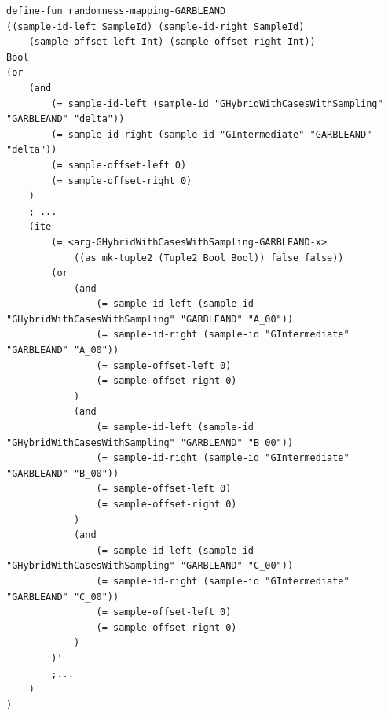 \begin{longlisting}
\begin{verbatim}
define-fun randomness-mapping-GARBLEAND
((sample-id-left SampleId) (sample-id-right SampleId)
    (sample-offset-left Int) (sample-offset-right Int))
Bool 
(or
    (and
        (= sample-id-left (sample-id "GHybridWithCasesWithSampling" "GARBLEAND" "delta"))
        (= sample-id-right (sample-id "GIntermediate" "GARBLEAND" "delta"))
        (= sample-offset-left 0)
        (= sample-offset-right 0)
    )
    ; ...
    (ite
        (= <arg-GHybridWithCasesWithSampling-GARBLEAND-x> 
            ((as mk-tuple2 (Tuple2 Bool Bool)) false false))
        (or
            (and
                (= sample-id-left (sample-id "GHybridWithCasesWithSampling" "GARBLEAND" "A_00"))
                (= sample-id-right (sample-id "GIntermediate" "GARBLEAND" "A_00"))
                (= sample-offset-left 0)
                (= sample-offset-right 0)
            )
            (and
                (= sample-id-left (sample-id "GHybridWithCasesWithSampling" "GARBLEAND" "B_00"))
                (= sample-id-right (sample-id "GIntermediate" "GARBLEAND" "B_00"))
                (= sample-offset-left 0)
                (= sample-offset-right 0)
            )
            (and
                (= sample-id-left (sample-id "GHybridWithCasesWithSampling" "GARBLEAND" "C_00"))
                (= sample-id-right (sample-id "GIntermediate" "GARBLEAND" "C_00"))
                (= sample-offset-left 0)
                (= sample-offset-right 0)
            )
        )'
        ;...
    )
)
\end{verbatim}
\caption{Conditional randomness mapping in game hop 5 of the  theorem}
\label{lst:domino-freexor-gamehop4-cond-rand}
\end{longlisting}